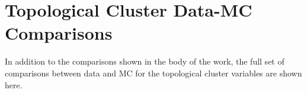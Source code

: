 \chapter{Topological Cluster Data-MC Comparisons} \label{app:datamc}

In addition to the comparisons shown in the body of the work, the full set of comparisons between data and \gls{MC} for the topological cluster variables are shown here. 

